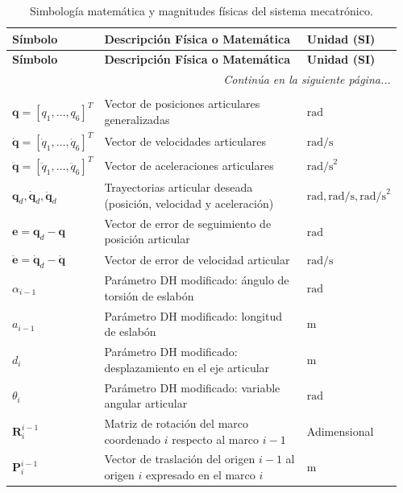 \documentclass[12pt]{article}
\begin{document}
\vspace{0.5cm}
\begin{longtable}{p{0.20\linewidth} p{0.62\linewidth} p{0.14\linewidth}}
\caption{Simbología matemática y magnitudes físicas del sistema mecatrónico.} \label{tab:simbologia} \\
\toprule
\textbf{Símbolo} & \textbf{Descripción Física o Matemática} & \textbf{Unidad (SI)} \\
\midrule
\endfirsthead
\toprule
\textbf{Símbolo} & \textbf{Descripción Física o Matemática} & \textbf{Unidad (SI)} \\
\midrule
\endhead
\midrule
\multicolumn{3}{r}{\textit{Continúa en la siguiente página...}} \\
\bottomrule
\endfoot
\bottomrule
\endlastfoot
\multicolumn{3}{l}{\textit{\textbf{Cinemática y Variables Articulares:}}} \\
$\bm{q} = [q_1, \dots, q_6]^T$ & Vector de posiciones articulares generalizadas & $\text{rad}$ \\
$\dot{\bm{q}} = [\dot{q}_1, \dots, \dot{q}_6]^T$ & Vector de velocidades articulares & $\text{rad/s}$ \\
$\ddot{\bm{q}} = [\ddot{q}_1, \dots, \ddot{q}_6]^T$ & Vector de aceleraciones articulares & $\text{rad/s}^2$ \\
$\bm{q}_d, \dot{\bm{q}}_d, \ddot{\bm{q}}_d$ & Trayectorias articular deseada (posición, velocidad y aceleración) & $\text{rad}, \text{rad/s}, \text{rad/s}^2$ \\
$\bm{e} = \bm{q}_d - \bm{q}$ & Vector de error de seguimiento de posición articular & $\text{rad}$ \\
$\dot{\bm{e}} = \dot{\bm{q}}_d - \dot{\bm{q}}$ & Vector de error de velocidad articular & $\text{rad/s}$ \\
$\alpha_{i-1}$ & Parámetro DH modificado: ángulo de torsión de eslabón & $\text{rad}$ \\
$a_{i-1}$ & Parámetro DH modificado: longitud de eslabón & $\text{m}$ \\
$d_i$ & Parámetro DH modificado: desplazamiento en el eje articular & $\text{m}$ \\
$\theta_i$ & Parámetro DH modificado: variable angular articular & $\text{rad}$ \\
$\bm{R}_i^{i-1}$ & Matriz de rotación del marco coordenado $i$ respecto al marco $i-1$ & Adimensional \\
$\bm{P}_i^{i-1}$ & Vector de traslación del origen $i-1$ al origen $i$ expresado en el marco $i$ & $\text{m}$ \\

\end{longtable}
\end{document}
